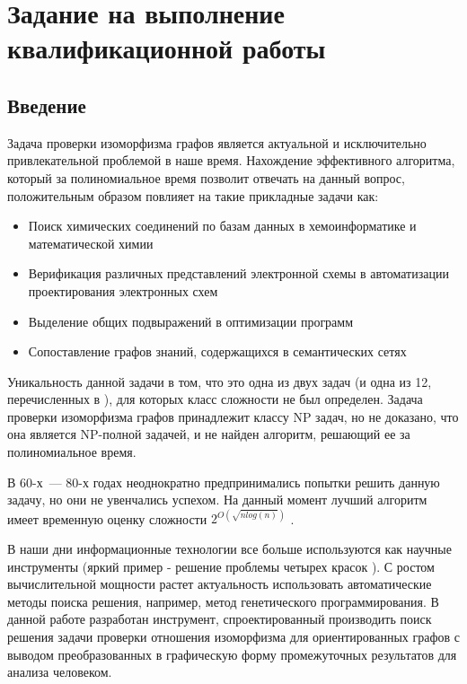 \documentclass[russian,utf8,emptystyle]{eskdtext}
\begin{document}


\section{Задание на выполнение квалификационной работы}

\newpage
\tableofcontents
\newpage

\begin{spacing}{1.5}
\section{Введение}
Задача проверки изоморфизма графов является актуальной и исключительно привлекательной проблемой в наше время. Нахождение эффективного алгоритма, который за полиномиальное время позволит отвечать на данный вопрос, положительным образом повлияет на такие прикладные задачи как:
\begin{itemize}
\item Поиск химических соединений по базам данных в хемоинформатике и математической химии
\item Верификация различных представлений электронной схемы в автоматизации проектирования электронных схем
\item Выделение общих подвыражений в оптимизации программ
\item Сопоставление графов знаний, содержащихся в семантических сетях
\end{itemize}
Уникальность данной задачи в том, что это одна из двух задач (и одна из 12, перечисленных в \cite{GareyAndJohnson1979}), для которых класс сложности не был определен. Задача проверки изоморфизма графов принадлежит классу NP задач, но не доказано, что она является NP-полной задачей, и не найден алгоритм, решающий ее за полиномиальное время.

В 60-х~--- 80-х годах неоднократно предпринимались попытки решить данную задачу, но они не увенчались успехом. На данный момент лучший алгоритм имеет временную оценку сложности $2^{O(\sqrt{n log(n)})}$ \cite{Johnson2005} \cite{BabaiCodenotti2008}.

В наши дни информационные технологии все больше используются как научные инструменты (яркий пример - решение проблемы четырех красок \cite{FourColourProblem}). С ростом вычислительной мощности растет актуальность использовать автоматические методы поиска решения, например, метод генетического программирования. В данной работе разработан инструмент, спроектированный производить поиск решения задачи проверки отношения изоморфизма для ориентированных графов с выводом преобразованных в графическую форму промежуточных результатов для анализа человеком.


\end{spacing}
\end{document}
